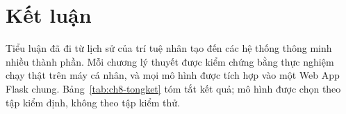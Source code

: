 \chapter*{Kết luận}
\setcounter{figure}{0}\setcounter{table}{0}
\renewcommand{\thefigure}{KL.\arabic{figure}}
\renewcommand{\thetable}{KL.\arabic{table}}

Tiểu luận đã đi từ lịch sử của trí tuệ nhân tạo đến các hệ thống thông minh nhiều thành phần. Mỗi chương lý thuyết được kiểm chứng bằng thực nghiệm chạy thật trên máy cá nhân, và mọi mô hình được tích hợp vào một Web App Flask chung. Bảng~\ref{tab:ch8-tongket} tóm tắt kết quả; mô hình được chọn theo tập kiểm định, không theo tập kiểm thử.


